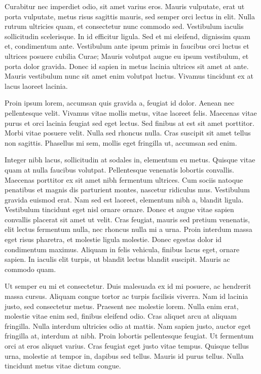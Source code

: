 \documentclass[book,A4paper,10pt,twoside,oldfontcommands]{memoir}\usepackage[]{graphicx}\usepackage[usenames,dvipsnames]{color}
\begin{document}
\begin{btUnit}
Curabitur nec imperdiet odio, sit amet varius eros. Mauris vulputate,
erat ut porta vulputate, metus risus sagittis mauris, sed semper orci
lectus in elit. Nulla rutrum ultricies quam, et consectetur nunc
commodo sed. Vestibulum iaculis sollicitudin scelerisque. In id
efficitur ligula. Sed et mi eleifend, dignissim quam et, condimentum
ante. Vestibulum ante ipsum primis in faucibus orci luctus et ultrices
posuere cubilia Curae; Mauris volutpat augue eu ipsum vestibulum, et
porta dolor gravida. Donec id sapien in metus lacinia ultrices sit
amet at ante. Mauris vestibulum nunc sit amet enim volutpat luctus.
Vivamus tincidunt ex at lacus laoreet lacinia.

Proin ipsum lorem, accumsan quis gravida a, feugiat id dolor. Aenean
nec pellentesque velit. Vivamus vitae mollis metus, vitae laoreet
felis. Maecenas vitae purus et orci lacinia feugiat sed eget lectus.
Sed finibus at est sit amet porttitor. Morbi vitae posuere velit.
Nulla sed rhoncus nulla. Cras suscipit sit amet tellus non sagittis.
Phasellus mi sem, mollis eget fringilla ut, accumsan sed enim.

Integer nibh lacus, sollicitudin at sodales in, elementum eu metus.
Quisque vitae quam at nulla faucibus volutpat. Pellentesque venenatis
lobortis convallis. Maecenas porttitor ex sit amet nibh fermentum
ultrices. Cum sociis natoque penatibus et magnis dis parturient
montes, nascetur ridiculus mus. Vestibulum gravida euismod erat. Nam
sed est laoreet, elementum nibh a, blandit ligula. Vestibulum
tincidunt eget nisl ornare ornare. Donec et augue vitae sapien
convallis placerat sit amet ut velit. Cras feugiat, mauris sed pretium
venenatis, elit lectus fermentum nulla, nec rhoncus nulla mi a urna.
Proin interdum massa eget risus pharetra, et molestie ligula molestie.
Donec egestas dolor id condimentum maximus. Aliquam in felis vehicula,
finibus lacus eget, ornare sapien. In iaculis elit turpis, ut blandit
lectus blandit suscipit. Mauris ac commodo quam.

Ut semper eu mi et consectetur. Duis malesuada ex id mi posuere, ac
hendrerit massa cursus. Aliquam congue tortor ac turpis facilisis
viverra. Nam id lacinia justo, sed consectetur metus. Praesent nec
molestie lorem. Nulla enim erat, molestie vitae enim sed, finibus
eleifend odio. Cras aliquet arcu at aliquam fringilla. Nulla interdum
ultricies odio at mattis. Nam sapien justo, auctor eget fringilla at,
interdum at nibh. Proin lobortis pellentesque feugiat. Ut fermentum
orci at eros aliquet varius. Cras feugiat eget justo vitae tempus.
Quisque tellus urna, molestie at tempor in, dapibus sed tellus. Mauris
id purus tellus. Nulla tincidunt metus vitae dictum congue.


\end{btUnit}
\end{document}
